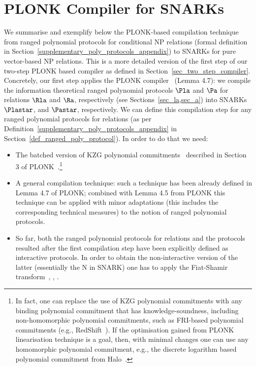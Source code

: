 \section{PLONK Compiler for SNARKs}
\label{first_step_compiler}

\noindent We summarise and exemplify below the PLONK-based compilation technique~\cite{plonk} from 
ranged polynomial protocols for conditional NP relations (formal definition in Section~\ref{supplementary_poly_protocols_appendix}) to 
SNARKs for pure vector-based NP relations. This is a more detailed version of the first step of our two-step PLONK based compiler as 
defined in Section~\ref{sec_two_step_compiler}. Concretely, our first step applies the PLONK compiler~\cite{plonk} (Lemma 4.7): 
we compile the information theoretical ranged polynomial protocols $\Pla$ and $\Pa$ for relations $\Rla$ and $\Ra$, respectively (see Sections~\ref{sec_la,sec_a}) 
into SNARKs $\Plastar$, and $\Pastar$, respectively. We can define this compilation step for any ranged polynomial protocols for relations 
(as per Definition~\ref{supplementary_poly_protocols_appendix} in Section~\ref{def_ranged_poly_protocol}). In order to do that we need: 
\begin{itemize}
\item  The batched version of KZG polynomial commitments~\cite{KZG_10} described in Section 3 of PLONK~\cite{plonk}.\footnote{In fact, 
one can replace the use of KZG polynomial commitments with any binding polynomial commitment that has knowledge-soundness, including non-homomorphic polynomial commitments, 
such as FRI-based polynomial commitments (e.g., RedShift~\cite{redshift}). If the optimisation gained from PLONK linearisation technique is a goal, 
then, with minimal changes one can use any homomorphic polynomial commitment, e.g., the discrete logarithm based polynomial commitment 
from Halo~\cite{halo}.}
\item A general compilation technique: such a technique has been already defined in Lemma 4.7 of PLONK; combined with Lemma 4.5 
from PLONK this technique can be applied with minor adaptations (this includes the corresponding technical measures) to the notion of ranged 
polynomial protocols.  
\item So far, both the ranged polynomial protocols for relations and the protocols resulted after the first compilation step have been explicitly defined as interactive 
protocols. In order to obtain the non-interactive version of the latter (essentially the N in SNARK) one has to apply the Fiat-Shamir 
transform~\cite{FS_transform}, \cite{FS_transform_with_proof}, \cite{SE_plonk}.
\end{itemize}

